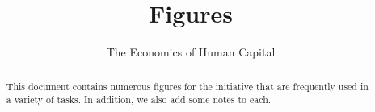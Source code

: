 

\title{Figures}
\subtitle{The Economics of Human Capital}
\date{}

\maketitle\vspace{-2cm}

\begin{abstract}
\noindent This document contains numerous figures for the initiative that are frequently used in a variety of tasks. In addition, we also add some notes to each.
\end{abstract}\vspace{1cm}

\tableofcontents\newpage\listoffigures



\clearpage



